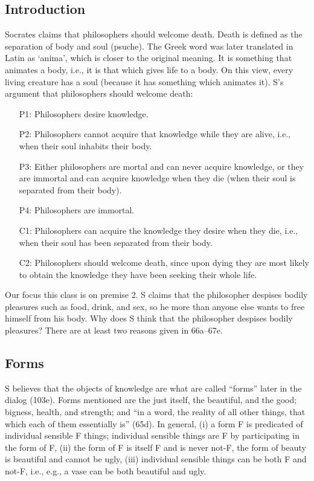 \documentclass[oneside]{article}
\begin{document}
\thispagestyle{fancy}

\subsection*{Introduction}\label{introduction}

Socrates claims that philosophers should welcome
death. Death is defined as the separation of body and soul (psuche).
The Greek word was later translated in Latin as `anima', which is closer
to the original meaning. It is something that animates a body, i.e., it
is that which gives life to a body. On this view, every living creature has a
soul (because it has something which animates it). S's argument that philosophers should welcome death:

\begin{itemize}
\item[P1:] Philosophers desire knowledge.
\item[P2:] Philosophers cannot acquire that knowledge while they are alive, i.e., when their soul inhabits their body.
\item[P3:] Either philosophers are mortal and can never acquire knowledge, or they are immortal and can acquire knowledge when they die (when their soul is separated from their body).
\item[P4:] Philosophers are immortal. 
\item[C1:] Philosophers can acquire the knowledge they desire when they die, i.e., when their soul has been separated from their body.
\item[C2:] Philosophers should welcome death, since upon dying they are most likely to obtain the knowledge they have been seeking their whole life.
\end{itemize}
Our focus this class is on premise 2. S claims that the philosopher despises bodily pleasures such as food, drink, and
  sex, so he more than anyone else wants to free himself from his body. Why does S think that the philosopher despises bodily pleasures? There are at least two reasons given in 66a--67e. 

\subsection*{Forms}
S believes that the objects of knowledge are what are called ``forms'' later in the dialog (103e). Forms  mentioned are the just itself, the beautiful, and the good; bigness, health, and strength; and ``in a word, the reality of all other things, that which each of them essentially is'' (65d). In general, (i) a form F is predicated of individual sensible F things; individual sensible things are F by participating in the form of F, (ii) the form of F is itself F and is never not-F, the form of beauty is beautiful and cannot be ugly, (iii) individual sensible things can be both F and not-F, i.e., e.g., a vase can be both beautiful and ugly. 
\end{document}
